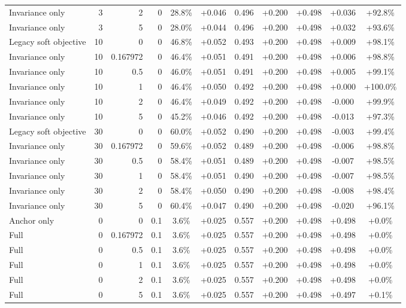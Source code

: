 \begin{table}[htbp]
\begin{tabular}{lrrrccccccc}
Invariance only & 3 & 2 & 0 & 28.8\% & +0.046 & 0.496 & +0.200 & +0.498 & +0.036 & +92.8\% \\
Invariance only & 3 & 5 & 0 & 28.0\% & +0.044 & 0.496 & +0.200 & +0.498 & +0.032 & +93.6\% \\
Legacy soft objective & 10 & 0 & 0 & 46.8\% & +0.052 & 0.493 & +0.200 & +0.498 & +0.009 & +98.1\% \\
Invariance only & 10 & 0.167972 & 0 & 46.4\% & +0.051 & 0.491 & +0.200 & +0.498 & +0.006 & +98.8\% \\
Invariance only & 10 & 0.5 & 0 & 46.0\% & +0.051 & 0.491 & +0.200 & +0.498 & +0.005 & +99.1\% \\
Invariance only & 10 & 1 & 0 & 46.4\% & +0.050 & 0.492 & +0.200 & +0.498 & +0.000 & +100.0\% \\
Invariance only & 10 & 2 & 0 & 46.4\% & +0.049 & 0.492 & +0.200 & +0.498 & -0.000 & +99.9\% \\
Invariance only & 10 & 5 & 0 & 45.2\% & +0.046 & 0.492 & +0.200 & +0.498 & -0.013 & +97.3\% \\
Legacy soft objective & 30 & 0 & 0 & 60.0\% & +0.052 & 0.490 & +0.200 & +0.498 & -0.003 & +99.4\% \\
Invariance only & 30 & 0.167972 & 0 & 59.6\% & +0.052 & 0.489 & +0.200 & +0.498 & -0.006 & +98.8\% \\
Invariance only & 30 & 0.5 & 0 & 58.4\% & +0.051 & 0.489 & +0.200 & +0.498 & -0.007 & +98.5\% \\
Invariance only & 30 & 1 & 0 & 58.4\% & +0.051 & 0.490 & +0.200 & +0.498 & -0.007 & +98.5\% \\
Invariance only & 30 & 2 & 0 & 58.4\% & +0.050 & 0.490 & +0.200 & +0.498 & -0.008 & +98.4\% \\
Invariance only & 30 & 5 & 0 & 60.4\% & +0.047 & 0.490 & +0.200 & +0.498 & -0.020 & +96.1\% \\
Anchor only & 0 & 0 & 0.1 & 3.6\% & +0.025 & 0.557 & +0.200 & +0.498 & +0.498 & +0.0\% \\
Full & 0 & 0.167972 & 0.1 & 3.6\% & +0.025 & 0.557 & +0.200 & +0.498 & +0.498 & +0.0\% \\
Full & 0 & 0.5 & 0.1 & 3.6\% & +0.025 & 0.557 & +0.200 & +0.498 & +0.498 & +0.0\% \\
Full & 0 & 1 & 0.1 & 3.6\% & +0.025 & 0.557 & +0.200 & +0.498 & +0.498 & +0.0\% \\
Full & 0 & 2 & 0.1 & 3.6\% & +0.025 & 0.557 & +0.200 & +0.498 & +0.498 & +0.0\% \\
Full & 0 & 5 & 0.1 & 3.6\% & +0.025 & 0.557 & +0.200 & +0.498 & +0.497 & +0.1\% \\

\end{tabular}
\end{table}
